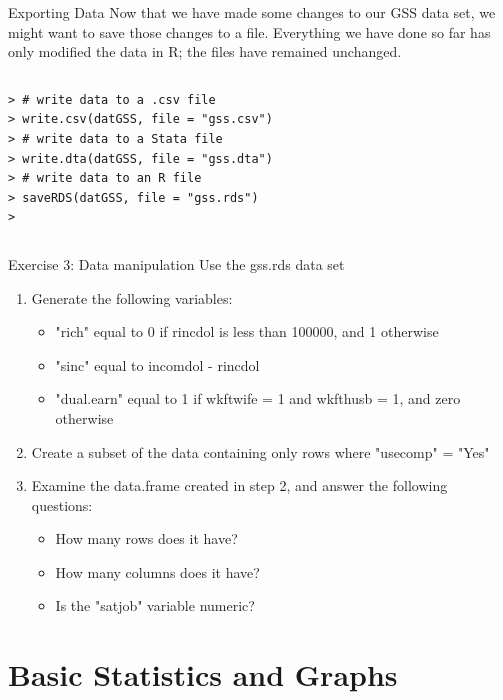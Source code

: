 \documentclass[table,smaller]{beamer}
\begin{document}
\begin{frame}[fragile,label=sec-5-6]{Exporting Data}
 Now that we have made some changes to our GSS data set, we might want to save those changes to a file. Everything we have done so far has only modified the data in R; the files have remained unchanged. 

\vspace{-.5em}
\begin{columns}
\begin{block}{}
\begin{verbatim}
> # write data to a .csv file
> write.csv(datGSS, file = "gss.csv")
> # write data to a Stata file
> write.dta(datGSS, file = "gss.dta")
> # write data to an R file
> saveRDS(datGSS, file = "gss.rds")
>
\end{verbatim}
\end{block}
\end{columns}
\vspace{.5em}
\end{frame}

\begin{frame}[label=sec-5-7]{Exercise 3: Data manipulation}
Use the gss.rds data set

\begin{enumerate}
\item Generate the following variables:
\begin{itemize}
\item "rich" equal to 0 if rincdol is less than 100000, and 1 otherwise
\item "sinc" equal to incomdol - rincdol
\item "dual.earn" equal to 1 if wkftwife = 1 and wkfthusb = 1, and zero otherwise
\end{itemize}
\item Create a subset of the data containing only rows where "usecomp" = "Yes"
\item Examine the data.frame created in step 2, and answer the following questions:
\begin{itemize}
\item How many rows does it have?
\item How many columns does it have?
\item Is the "satjob" variable numeric?
\end{itemize}
\end{enumerate}
\end{frame}
\section{Basic Statistics and Graphs}
\label{sec-6}
\end{document}
